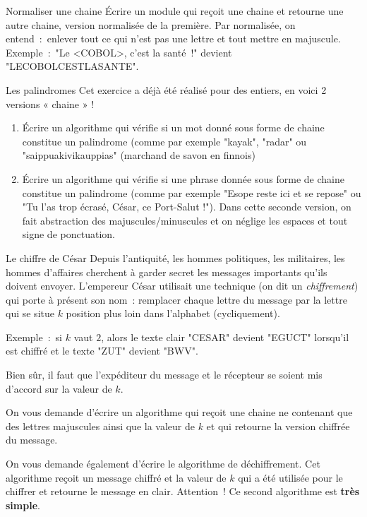 	\begin{Exercice}{Normaliser une chaine}
		Écrire un module qui reçoit une chaine et retourne une autre chaine,
		version normalisée de la première.
		Par normalisée, on entend~:~enlever tout ce qui n'est pas une lettre 
		et tout mettre en majuscule.
		\\Exemple~:~"Le <COBOL>, c'est la santé~!" devient "LECOBOLCESTLASANTE".
	\end{Exercice}
		
	\begin{Exercice}{Les palindromes}
		Cet exercice a déjà été réalisé pour des entiers, 
		en voici 2 versions « chaine » ! 
		\begin{enumerate}[label=\alph*)]
		\item 
			Écrire un algorithme qui vérifie 
			si un mot donné sous forme de chaine 
			constitue un palindrome 
			(comme par exemple "kayak", "radar" ou "saippuakivikauppias" 
			(marchand de savon en finnois)
		\item
			Écrire un algorithme qui vérifie 
			si une phrase donnée sous forme de chaine constitue un palindrome 
			(comme par exemple "Esope reste ici et se repose" 
			ou "Tu l'as trop écrasé, César, ce Port-Salut !"). 
			Dans cette seconde version, 
			on fait abstraction des majuscules/minuscules 
			et on néglige les espaces et tout signe de ponctuation.
		\end{enumerate}
	\end{Exercice}
	
	\begin{Exercice}{Le chiffre de César}
		\label{ex:cesar}
		Depuis l'antiquité, les hommes politiques, les militaires, 
		les hommes d'affaires cherchent à garder secret les messages
		importants qu'ils doivent envoyer.
		L'empereur César utilisait une technique (on dit un \emph{chiffrement})
		qui porte à présent son nom~:
		remplacer chaque lettre du message par la lettre qui se situe 
		$k$ position plus loin dans l'alphabet (cycliquement).
		
		Exemple~:~si $k$ vaut $2$, 
		alors le texte clair "CESAR" devient "EGUCT" lorsqu'il est chiffré 
		et le texte "ZUT" devient "BWV".
		
		Bien sûr, il faut que l'expéditeur du message et le récepteur
		se soient mis d'accord sur la valeur de $k$.
		
		On vous demande d'écrire un algorithme qui reçoit une chaine ne contenant
		que des lettres majuscules ainsi que la valeur de $k$ et qui retourne
		la version chiffrée du message.
	
		On vous demande également d'écrire le algorithme de déchiffrement.
		Cet algorithme reçoit un message chiffré et la valeur de $k$ qui a été
		utilisée pour le chiffrer et retourne le message en clair.
		Attention~! Ce second algorithme est \textbf{très simple}.
	\end{Exercice}

